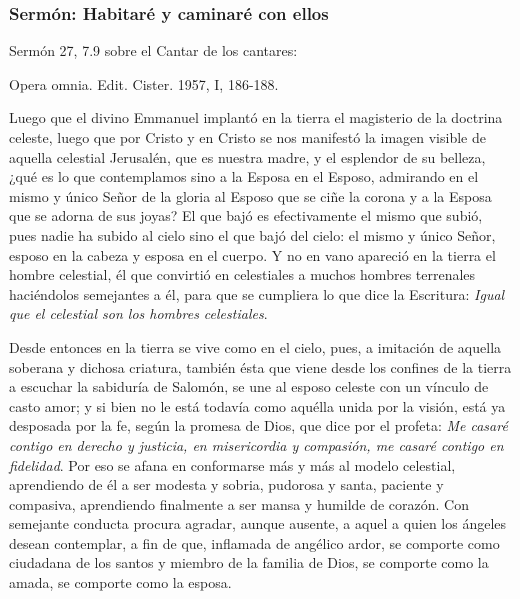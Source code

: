 \begin{body}
\begin{body}
\subsubsection{Sermón: Habitaré y caminaré con ellos}

Sermón 27, 7.9 sobre el Cantar de los cantares:

Opera omnia. Edit. Cister. 1957, I, 186-188.

Luego que el divino Emmanuel implantó en la tierra el magisterio de la doctrina celeste, luego que por Cristo y en Cristo se nos manifestó la imagen visible de aquella celestial Jerusalén, que es nuestra madre, y el esplendor de su belleza, ¿qué es lo que contemplamos sino a la Esposa en el Esposo, admirando en el mismo y único Señor de la gloria al Esposo que se ciñe la corona y a la Esposa que se adorna de sus joyas? El que bajó es efectivamente el mismo que subió, pues nadie ha subido al cielo sino el que bajó del cielo: el mismo y único Señor, esposo en la cabeza y esposa en el cuerpo. Y no en vano apareció en la tierra el hombre celestial, él que convirtió en celestiales a muchos hombres terrenales haciéndolos semejantes a él, para que se cumpliera lo que dice la Escritura: \emph{Igual que el celestial son los hombres celestiales}.

Desde entonces en la tierra se vive como en el cielo, pues, a imitación de aquella soberana y dichosa criatura, también ésta que viene desde los confines de la tierra a escuchar la sabiduría de Salomón, se une al esposo celeste con un vínculo de casto amor; y si bien no le está todavía como aquélla unida por la visión, está ya desposada por la fe, según la promesa de Dios, que dice por el profeta: \emph{Me casaré contigo en derecho y justicia, en misericordia y compasión, me casaré contigo en fidelidad}. Por eso se afana en conformarse más y más al modelo celestial, aprendiendo de él a ser modesta y sobria, pudorosa y santa, paciente y compasiva, aprendiendo finalmente a ser mansa y humilde de corazón. Con semejante conducta procura agradar, aunque ausente, a aquel a quien los ángeles desean contemplar, a fin de que, inflamada de angélico ardor, se comporte como ciudadana de los santos y miembro de la familia de Dios, se comporte como la amada, se comporte como la esposa.


\end{body}
\end{body}
